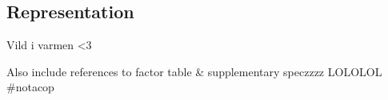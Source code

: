 \subsection{Representation}

Vild i varmen <3

Also include references to factor table \& supplementary speczzzz LOLOLOL #notacop